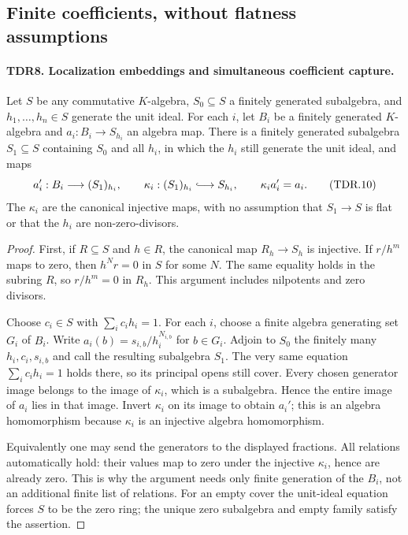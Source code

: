 \subsection{Finite coefficients, without flatness assumptions}

\paragraph{TDR8. Localization embeddings and simultaneous coefficient capture.}
\label{claim:TDR8}
Let \(S\) be any commutative \(K\)-algebra,
\(S_0\subseteq S\) a finitely generated subalgebra, and
\(h_1,\ldots,h_n\in S\) generate the unit ideal.
For each \(i\), let \(B_i\) be a finitely generated
\(K\)-algebra and \(a_i:B_i\to S_{h_i}\) an algebra map.
There is a finitely generated subalgebra \(S_1\subseteq S\)
containing \(S_0\) and all \(h_i\), in which the \(h_i\)
still generate the unit ideal, and maps
\[
 a_i':B_i\longrightarrow (S_1)_{h_i},\qquad
 \kappa_i:(S_1)_{h_i}\lhook\joinrel\longrightarrow S_{h_i},
 \qquad \kappa_i a_i'=a_i.                                  \tag{TDR.10}
\]
The \(\kappa_i\) are the canonical injective maps, with no
assumption that \(S_1\to S\) is flat or that the \(h_i\)
are non-zero-divisors.

\begin{proof}
First, if \(R\subseteq S\) and \(h\in R\), the canonical
map \(R_h\to S_h\) is injective.  If \(r/h^m\) maps to
zero, then \(h^N r=0\) in \(S\) for some \(N\).
The same equality holds in the subring \(R\), so \(r/h^m=0\)
in \(R_h\).  This argument includes nilpotents and zero divisors.

Choose \(c_i\in S\) with \(\sum_i c_i h_i=1\).
For each \(i\), choose a finite algebra generating set \(G_i\)
of \(B_i\).  Write
\(a_i(b)=s_{i,b}/h_i^{N_{i,b}}\) for \(b\in G_i\).
Adjoin to \(S_0\) the finitely many \(h_i,c_i,s_{i,b}\)
and call the resulting subalgebra \(S_1\).  The very same
equation \(\sum_i c_i h_i=1\) holds there, so its principal
opens still cover.  Every chosen generator image belongs to the
image of \(\kappa_i\), which is a subalgebra.  Hence the entire
image of \(a_i\) lies in that image.  Invert \(\kappa_i\)
on its image to obtain \(a_i'\); this is an algebra homomorphism
because \(\kappa_i\) is an injective algebra homomorphism.

Equivalently one may send the generators to the displayed fractions.
All relations automatically hold: their values map to zero under
the injective \(\kappa_i\), hence are already zero.  This is why
the argument needs only finite generation of the \(B_i\), not
an additional finite list of relations.  For an empty cover the
unit-ideal equation forces \(S\) to be the zero ring; the unique
zero subalgebra and empty family satisfy the assertion.
\end{proof}

